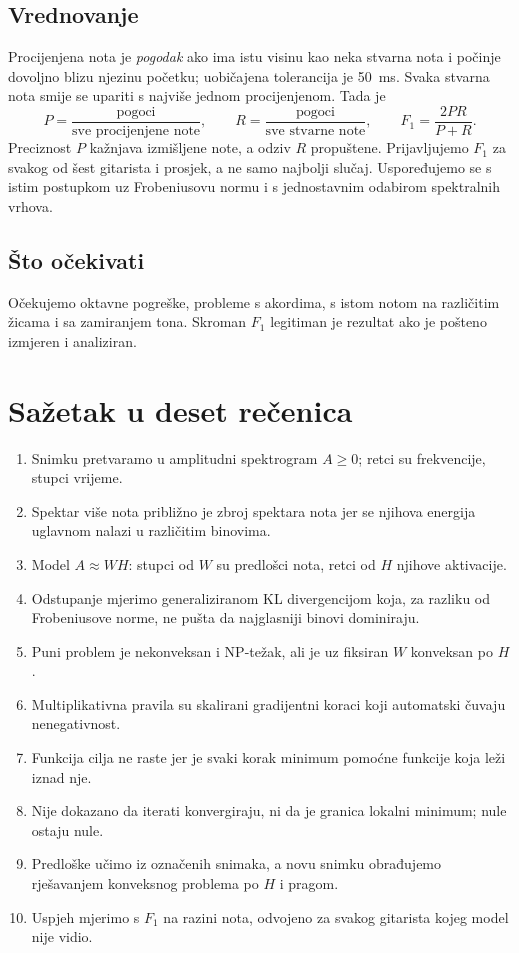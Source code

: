 \documentclass[11pt,a4paper]{article}
\theoremstyle{definition}
\theoremstyle{plain}
\theoremstyle{remark}
\begin{document}
\subsection{Vrednovanje}

Procijenjena nota je \emph{pogodak} ako ima istu visinu kao neka stvarna nota i počinje dovoljno blizu
njezinu početku; uobičajena tolerancija je 50~ms. Svaka stvarna nota smije se upariti s najviše
jednom procijenjenom. Tada je
\[
  P=\frac{\text{pogoci}}{\text{sve procijenjene note}},\qquad
  R=\frac{\text{pogoci}}{\text{sve stvarne note}},\qquad
  F_1=\frac{2PR}{P+R}.
\]
Preciznost $P$ kažnjava izmišljene note, a odziv $R$ propuštene. Prijavljujemo $F_1$ za svakog od
šest gitarista i prosjek, a ne samo najbolji slučaj. Uspoređujemo se s istim postupkom uz
Frobeniusovu normu i s jednostavnim odabirom spektralnih vrhova.

\subsection{Što očekivati}

Očekujemo oktavne pogreške, probleme s akordima, s istom notom na različitim žicama i sa zamiranjem
tona. Skroman $F_1$ legitiman je rezultat ako je pošteno izmjeren i analiziran.

\section{Sažetak u deset rečenica}\label{sec:i-sazetak}

\begin{ukratko}
\begin{enumerate}
\item Snimku pretvaramo u amplitudni spektrogram $A\geq0$; retci su frekvencije, stupci vrijeme.
\item Spektar više nota približno je zbroj spektara nota jer se njihova energija uglavnom nalazi u
  različitim binovima.
\item Model $A\approx WH$: stupci od $W$ su predlošci nota, retci od $H$ njihove aktivacije.
\item Odstupanje mjerimo generaliziranom KL divergencijom koja, za razliku od Frobeniusove norme,
  ne pušta da najglasniji binovi dominiraju.
\item Puni problem je nekonveksan i NP-težak, ali je uz fiksiran $W$ konveksan po $H$.
\item Multiplikativna pravila su skalirani gradijentni koraci koji automatski čuvaju nenegativnost.
\item Funkcija cilja ne raste jer je svaki korak minimum pomoćne funkcije koja leži iznad nje.
\item Nije dokazano da iterati konvergiraju, ni da je granica lokalni minimum; nule ostaju nule.
\item Predloške učimo iz označenih snimaka, a novu snimku obrađujemo rješavanjem konveksnog
  problema po $H$ i pragom.
\item Uspjeh mjerimo s $F_1$ na razini nota, odvojeno za svakog gitarista kojeg model nije vidio.
\end{enumerate}
\end{ukratko}
\end{document}
